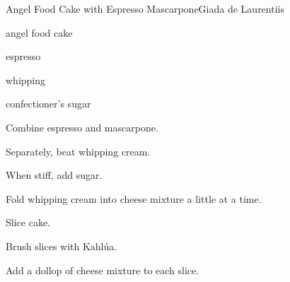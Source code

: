 \begin{recipe}{Angel Food Cake with Espresso Mascarpone}{Giada de Laurentiis}{}

\begin{ingredients}
\item angel food cake
\item \C{\threequarter} 
\item {} espresso
\item {} whipping 
\item \C{\half} confectioner's sugar
\item {}
\end{ingredients}

\begin{directions}
\item Combine espresso and mascarpone.
\item Separately, beat whipping cream.
\item When stiff, add sugar.
\item Fold whipping cream into cheese mixture a little at a time.
\item Slice cake.
\item Brush slices with Kahlúa.
\item Add a dollop of cheese mixture to each slice.
\end{directions}

\end{recipe}
